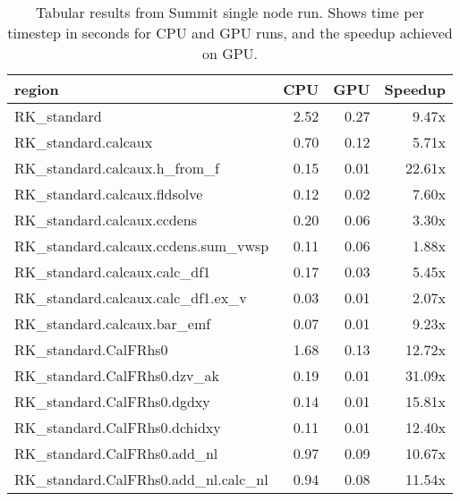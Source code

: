 \begin{table*}[htb]
  \centering
  \begin{tabular}{|l|rrr|}
  \hline
  region & CPU & GPU & Speedup \\
  \hline
  RK{\_}standard                                          &   2.52 &  0.27 &  9.47x \\
  RK{\_}standard.calcaux                                  &   0.70 &  0.12 &  5.71x \\
  RK{\_}standard.calcaux.h{\_}from{\_}f                   &   0.15 &  0.01 & 22.61x \\
  RK{\_}standard.calcaux.fldsolve                         &   0.12 &  0.02 &  7.60x \\
  RK{\_}standard.calcaux.ccdens                           &   0.20 &  0.06 &  3.30x \\
  RK{\_}standard.calcaux.ccdens.sum{\_}vwsp               &   0.11 &  0.06 &  1.88x \\
  RK{\_}standard.calcaux.calc{\_}df1                      &   0.17 &  0.03 &  5.45x \\
  RK{\_}standard.calcaux.calc{\_}df1.ex{\_}v              &   0.03 &  0.01 &  2.07x \\
  RK{\_}standard.calcaux.bar{\_}emf                       &   0.07 &  0.01 &  9.23x \\
  RK{\_}standard.CalFRhs0                                 &   1.68 &  0.13 & 12.72x \\
  RK{\_}standard.CalFRhs0.dzv{\_}ak                       &   0.19 &  0.01 & 31.09x \\
  RK{\_}standard.CalFRhs0.dgdxy                           &   0.14 &  0.01 & 15.81x \\
  RK{\_}standard.CalFRhs0.dchidxy                         &   0.11 &  0.01 & 12.40x \\
  RK{\_}standard.CalFRhs0.add{\_}nl                       &   0.97 &  0.09 & 10.67x \\
  RK{\_}standard.CalFRhs0.add{\_}nl.calc{\_}nl            &   0.94 &  0.08 & 11.54x \\
  \hline
  \end{tabular}
  \caption{Tabular results from Summit single node run. Shows time per timestep in seconds for CPU and GPU runs, and the speedup achieved on GPU.}
  \label{tab:single_node}
\end{table*}

